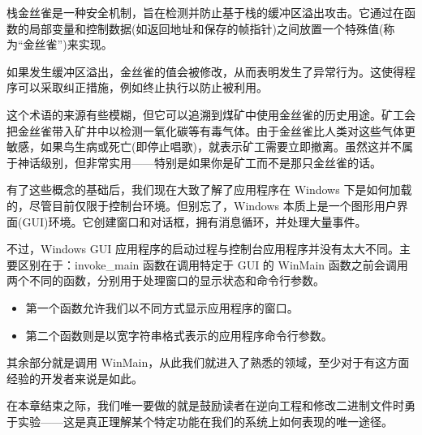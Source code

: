 栈金丝雀是一种安全机制，旨在检测并防止基于栈的缓冲区溢出攻击。它通过在函数的局部变量和控制数据(如返回地址和保存的帧指针)之间放置一个特殊值(称为“金丝雀”)来实现。

如果发生缓冲区溢出，金丝雀的值会被修改，从而表明发生了异常行为。这使得程序可以采取纠正措施，例如终止执行以防止被利用。

这个术语的来源有些模糊，但它可以追溯到煤矿中使用金丝雀的历史用途。矿工会把金丝雀带入矿井中以检测一氧化碳等有毒气体。由于金丝雀比人类对这些气体更敏感，如果鸟生病或死亡(即停止唱歌)，就表示矿工需要立即撤离。虽然这并不属于神话级别，但非常实用——特别是如果你是矿工而不是那只金丝雀的话。

有了这些概念的基础后，我们现在大致了解了应用程序在 Windows 下是如何加载的，尽管目前仅限于控制台环境。但别忘了，Windows 本质上是一个图形用户界面(GUI)环境。它创建窗口和对话框，拥有消息循环，并处理大量事件。

不过，Windows GUI 应用程序的启动过程与控制台应用程序并没有太大不同。主要区别在于：invoke\_main 函数在调用特定于 GUI 的 WinMain 函数之前会调用两个不同的函数，分别用于处理窗口的显示状态和命令行参数。

\begin{itemize}
\item 
第一个函数允许我们以不同方式显示应用程序的窗口。

\item 
第二个函数则是以宽字符串格式表示的应用程序命令行参数。
\end{itemize}

其余部分就是调用 WinMain，从此我们就进入了熟悉的领域，至少对于有这方面经验的开发者来说是如此。

在本章结束之际，我们唯一要做的就是鼓励读者在逆向工程和修改二进制文件时勇于实验——这是真正理解某个特定功能在我们的系统上如何表现的唯一途径。





